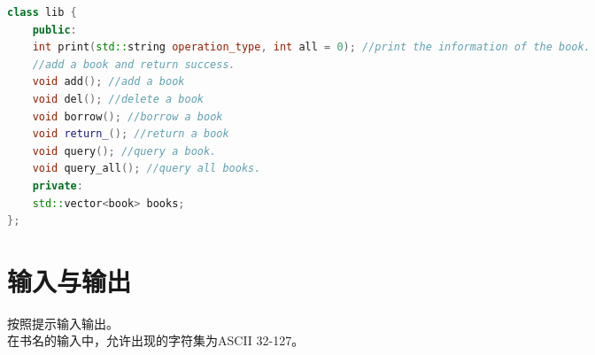 \documentclass{article}
\begin{document}
\begin{CJK}{UTF8}{song}
\begin{lstlisting}[language=C++]
class lib {
	public:
	int print(std::string operation_type, int all = 0); //print the information of the book.
	//add a book and return success.
	void add(); //add a book
	void del(); //delete a book
	void borrow(); //borrow a book
	void return_(); //return a book
	void query(); //query a book.
	void query_all(); //query all books.
	private:
	std::vector<book> books;
};
\end{lstlisting}

\section{输入与输出}

按照提示输入输出。\\
在书名的输入中，允许出现的字符集为ASCII 32-127。

\end{CJK}
\end{document}
